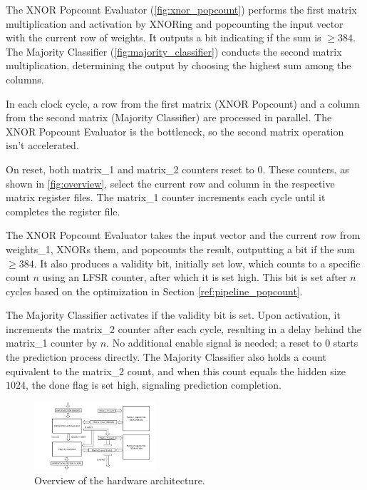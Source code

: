 \documentclass[conference]{IEEEtran}
\begin{document}
The XNOR Popcount Evaluator (\autoref{fig:xnor_popcount}) performs the first matrix multiplication and activation by XNORing and popcounting the input vector with the current row of weights. It outputs a bit indicating if the sum is $\geq 384$. The Majority Classifier (\autoref{fig:majority_classifier}) conducts the second matrix multiplication, determining the output by choosing the highest sum among the columns.

In each clock cycle, a row from the first matrix (XNOR Popcount) and a column from the second matrix (Majority Classifier) are processed in parallel. The XNOR Popcount Evaluator is the bottleneck, so the second matrix operation isn't accelerated. 

On reset, both matrix\_1 and matrix\_2 counters reset to 0. These counters, as shown in \autoref{fig:overview}, select the current row and column in the respective matrix register files. The matrix\_1 counter increments each cycle until it completes the register file. 

The XNOR Popcount Evaluator takes the input vector and the current row from weights\_1, XNORs them, and popcounts the result, outputting a bit if the sum $\geq 384$. It also produces a validity bit, initially set low, which counts to a specific count $n$ using an LFSR counter, after which it is set high. This bit is set after $n$ cycles based on the optimization in Section \ref{ref:pipeline_popcount}.

The Majority Classifier activates if the validity bit is set. Upon activation, it increments the matrix\_2 counter after each cycle, resulting in a delay behind the matrix\_1 counter by $n$. No additional enable signal is needed; a reset to 0 starts the prediction process directly. The Majority Classifier also holds a count equivalent to the matrix\_2 count, and when this count equals the hidden size $1024$, the done flag is set high, signaling prediction completion.




\begin{figure}[h]
    \centering
    \includegraphics[width=0.4\textwidth]{overview.pdf}
    \caption{Overview of the hardware architecture.}
    \label{fig:overview}
\end{figure}
\end{document}
